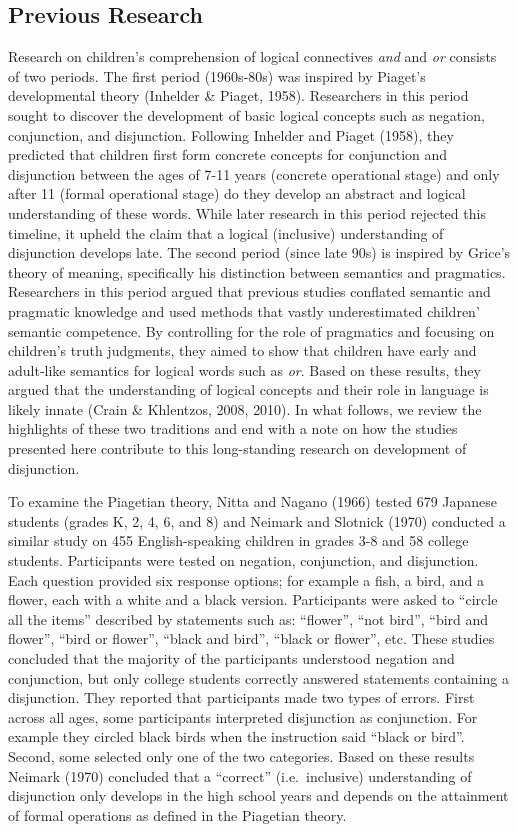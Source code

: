 \documentclass[floatsintext,man]{apa6}
\theoremstyle{definition}
\theoremstyle{definition}
\theoremstyle{definition}
\theoremstyle{remark}
\begin{document}
\subsection{Previous Research}\label{litreview}

Research on children's comprehension of logical connectives \emph{and}
and \emph{or} consists of two periods. The first period (1960s-80s) was
inspired by Piaget's developmental theory (Inhelder \& Piaget, 1958).
Researchers in this period sought to discover the development of basic
logical concepts such as negation, conjunction, and disjunction.
Following Inhelder and Piaget (1958), they predicted that children first
form concrete concepts for conjunction and disjunction between the ages
of 7-11 years (concrete operational stage) and only after 11 (formal
operational stage) do they develop an abstract and logical understanding
of these words. While later research in this period rejected this
timeline, it upheld the claim that a logical (inclusive) understanding
of disjunction develops late. The second period (since late 90s) is
inspired by Grice's theory of meaning, specifically his distinction
between semantics and pragmatics. Researchers in this period argued that
previous studies conflated semantic and pragmatic knowledge and used
methods that vastly underestimated children' semantic competence. By
controlling for the role of pragmatics and focusing on children's truth
judgments, they aimed to show that children have early and adult-like
semantics for logical words such as \emph{or}. Based on these results,
they argued that the understanding of logical concepts and their role in
language is likely innate (Crain \& Khlentzos, 2008, 2010). In what
follows, we review the highlights of these two traditions and end with a
note on how the studies presented here contribute to this long-standing
research on development of disjunction.

To examine the Piagetian theory, Nitta and Nagano (1966) tested 679
Japanese students (grades K, 2, 4, 6, and 8) and Neimark and Slotnick
(1970) conducted a similar study on 455 English-speaking children in
grades 3-8 and 58 college students. Participants were tested on
negation, conjunction, and disjunction. Each question provided six
response options; for example a fish, a bird, and a flower, each with a
white and a black version. Participants were asked to \enquote{circle
all the items} described by statements such as: \enquote{flower},
\enquote{not bird}, \enquote{bird and flower}, \enquote{bird or flower},
\enquote{black and bird}, \enquote{black or flower}, etc. These studies
concluded that the majority of the participants understood negation and
conjunction, but only college students correctly answered statements
containing a disjunction. They reported that participants made two types
of errors. First across all ages, some participants interpreted
disjunction as conjunction. For example they circled black birds when
the instruction said \enquote{black or bird}. Second, some selected only
one of the two categories. Based on these results Neimark (1970)
concluded that a \enquote{correct} (i.e.~inclusive) understanding of
disjunction only develops in the high school years and depends on the
attainment of formal operations as defined in the Piagetian theory.
\end{document}
